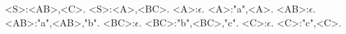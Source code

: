 <S>:<AB>,<C>.
<S>:<A>,<BC>.
<A>:$\epsilon$.
<A>:"a",<A>.
<AB>:$\epsilon$.
<AB>:"a",<AB>,"b".
<BC>:$\epsilon$.
<BC>:"b",<BC>,"c".
<C>:$\epsilon$.
<C>:"c",<C>.
